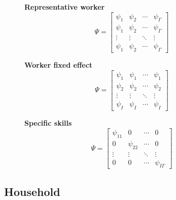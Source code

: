 \documentclass[12pt]{article}
\theoremstyle{definition}
\theoremstyle{plain}
\begin{document}
\begin{figure}[!htbp]
	\centering
	\begin{minipage}{0.3\textwidth}
		\centering
		\textbf{Representative worker}
		\[
		\Psi = \begin{bmatrix}
			\psi_{1} 	& \psi_{2}	& \cdots & \psi_{\Gamma}	\\ 
			\psi_{1}	& \psi_{2} 	& \cdots & \psi_{\Gamma}	\\ 
			\vdots 		& \vdots 	& \ddots & \vdots 			\\ 
			\psi_{1}	& \psi_{2}	& \cdots & \psi_{\Gamma}
		\end{bmatrix}
		\]
	\end{minipage}
	\begin{minipage}{0.3\textwidth}
		\centering
		\textbf{Worker fixed effect}
		\[
		\Psi = \begin{bmatrix}
			\psi_{1} 	& \psi_{1}	& \cdots & \psi_{1}		\\ 
			\psi_{2}	& \psi_{2} 	& \cdots & \psi_{2}		\\ 
			\vdots 		& \vdots 	& \ddots & \vdots 		\\ 
			\psi_{I}	& \psi_{I}	& \cdots & \psi_{I}
		\end{bmatrix}
		\]
	\end{minipage}
	\begin{minipage}{.3\textwidth}
		\centering
		\textbf{Specific skills}
		\[
		\Psi = \begin{bmatrix}
			\psi_{11} 	& 0 		& \cdots & 0			\\ 
			0  			& \psi_{22} & \cdots & 0 			\\ 
			\vdots 		& \vdots 	& \ddots & \vdots 		\\ 
			0 			& 0 		& \cdots & \psi_{I\Gamma}
		\end{bmatrix}
		\]
	\end{minipage}%
\end{figure}



\subsection{Household}
\end{document}
